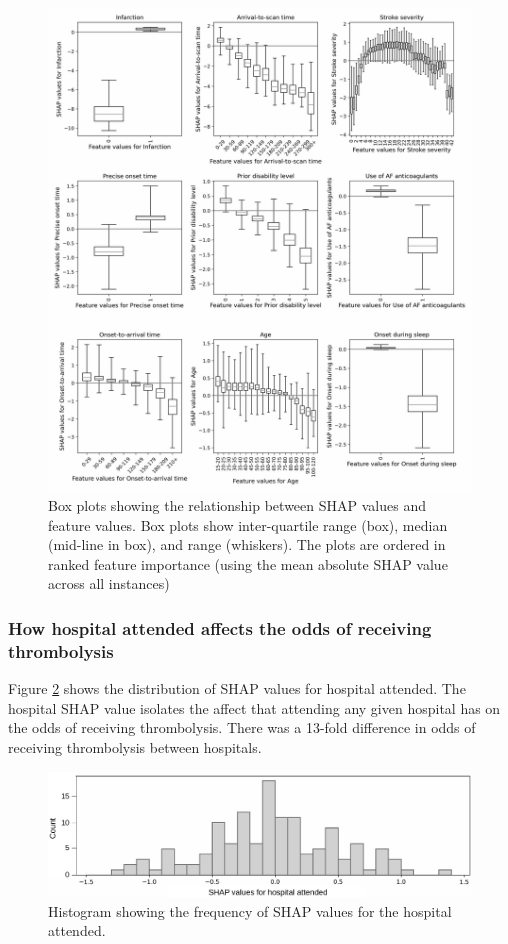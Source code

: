 \begin{figure}
    \centering
    \includegraphics[width=1\linewidth]{images/p2_patient_shap.jpg}
    \caption{Box plots showing the relationship between SHAP values and feature values. Box plots show inter-quartile range (box), median (mid-line in box), and range (whiskers). The plots are ordered in ranked feature importance (using the mean absolute SHAP value across all instances)}
    \label{fig:global_shap}
\end{figure}

\subsubsection{How hospital attended affects the odds of receiving thrombolysis}

Figure \ref{fig:hospital_shap} shows the distribution of SHAP values for hospital attended. The hospital SHAP value isolates the affect that attending any given hospital has on the odds of receiving thrombolysis. There was a 13-fold difference in odds of receiving thrombolysis between hospitals.

\begin{figure}
    \centering
    \includegraphics[width=1\linewidth]{images/p2_hosp_shap.jpg}
    \caption{Histogram showing the frequency of SHAP values for the hospital attended.}
    \label{fig:hospital_shap}
\end{figure}

